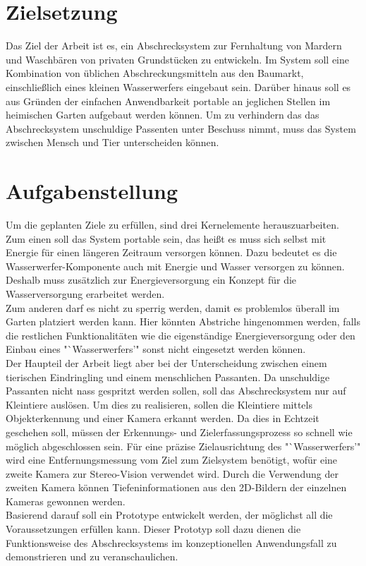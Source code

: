 \section{Zielsetzung}

Das Ziel der Arbeit ist es, ein Abschrecksystem zur Fernhaltung von Mardern und Waschbären von privaten Grundstücken zu entwickeln. Im System soll eine Kombination von üblichen Abschreckungsmitteln aus den Baumarkt, einschließlich eines kleinen Wasserwerfers eingebaut sein. Darüber hinaus soll es aus Gründen der einfachen Anwendbarkeit portable an jeglichen Stellen im heimischen Garten aufgebaut werden können. Um zu verhindern das das Abschrecksystem unschuldige Passenten unter Beschuss nimmt, muss das System zwischen Mensch und Tier unterscheiden können.

\section{Aufgabenstellung}

Um die geplanten Ziele zu erfüllen, sind drei Kernelemente herauszuarbeiten. Zum einen soll das System portable sein, das heißt es muss sich selbst mit Energie für einen längeren Zeitraum versorgen können. Dazu bedeutet es die Wasserwerfer-Komponente auch mit Energie und Wasser versorgen zu können. Deshalb muss zusätzlich zur Energieversorgung ein Konzept für die Wasserversorgung erarbeitet werden.
\\
Zum anderen darf es nicht zu sperrig werden, damit es problemlos überall im Garten platziert werden kann. Hier könnten Abstriche hingenommen werden, falls die restlichen Funktionalitäten wie die eigenständige Energieversorgung oder den Einbau eines "`Wasserwerfers'" sonst nicht eingesetzt werden können.
\\
Der Haupteil der Arbeit liegt aber bei der Unterscheidung zwischen einem tierischen Eindringling und einem menschlichen Passanten. Da unschuldige Passanten nicht nass gespritzt werden sollen, soll das Abschrecksystem nur auf Kleintiere auslösen. Um dies zu realisieren, sollen die Kleintiere mittels Objekterkennung und einer Kamera erkannt werden. Da dies in Echtzeit geschehen soll, müssen der Erkennungs- und Zielerfassungsprozess so schnell wie möglich abgeschlossen sein. Für eine präzise Zielausrichtung des "`Wasserwerfers'" wird eine Entfernungsmessung vom Ziel zum Zielsystem benötigt, wofür eine zweite Kamera zur Stereo-Vision verwendet wird. Durch die Verwendung der zweiten Kamera können Tiefeninformationen aus den 2D-Bildern der einzelnen Kameras gewonnen werden.
\\
Basierend darauf soll ein Prototype entwickelt werden, der möglichst all die Voraussetzungen erfüllen kann. Dieser Prototyp soll dazu dienen die Funktionsweise des Abschrecksystems im konzeptionellen Anwendungsfall zu demonstrieren und zu veranschaulichen.

